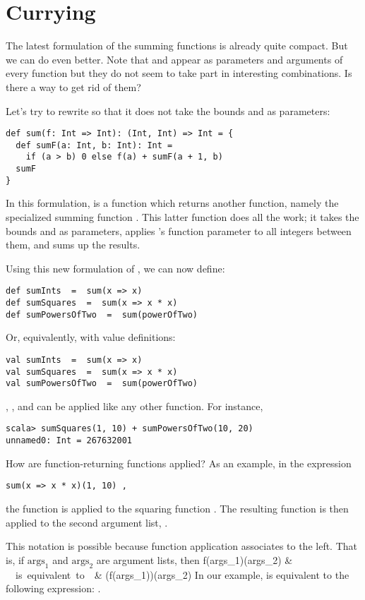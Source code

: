 \section{Currying}

The latest formulation of the summing functions is already quite
compact. But we can do even better. Note that
 and  appear as parameters and arguments of every function
but they do not seem to take part in interesting combinations. Is
there a way to get rid of them?

Let's try to rewrite  so that it does not take the bounds
 and  as parameters:
\begin{lstlisting}
def sum(f: Int => Int): (Int, Int) => Int = {
  def sumF(a: Int, b: Int): Int =
    if (a > b) 0 else f(a) + sumF(a + 1, b)
  sumF
}
\end{lstlisting}
In this formulation,  is a function which returns another
function, namely the specialized summing function . This
latter function does all the work; it takes the bounds  and
 as parameters, applies 's function parameter  to all
integers between them, and sums up the results. 

Using this new formulation of , we can now define:
\begin{lstlisting}
def sumInts  =  sum(x => x)
def sumSquares  =  sum(x => x * x)
def sumPowersOfTwo  =  sum(powerOfTwo)
\end{lstlisting}
Or, equivalently, with value definitions:
\begin{lstlisting}
val sumInts  =  sum(x => x)
val sumSquares  =  sum(x => x * x)
val sumPowersOfTwo  =  sum(powerOfTwo)
\end{lstlisting}

, , and  can be
applied like any other function. For instance,
\begin{lstlisting}
scala> sumSquares(1, 10) + sumPowersOfTwo(10, 20)
unnamed0: Int = 267632001
\end{lstlisting}
How are function-returning functions applied? As an example, in the expression
\begin{lstlisting}
sum(x => x * x)(1, 10) ,
\end{lstlisting}
the function  is applied to the squaring function 
. The resulting function is then 
applied to the second argument list, .

This notation is possible because function application associates to the left.
That is, if $\mbox{args}_1$ and $\mbox{args}_2$ are argument lists, then 
f(\mbox{args}_1)(\mbox{args}_2) & \ \ \mbox{is equivalent to}\ \ & (f(\mbox{args}_1))(\mbox{args}_2)
\eda
In our example,  is equivalent to the
following expression:
.

